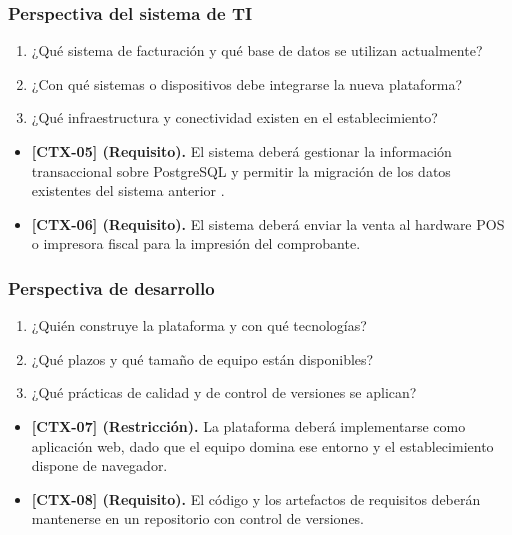 \documentclass[onecolumn,12pt]{IEEEtran}
\begin{document}
\subsubsection{Perspectiva del sistema de TI}
\begin{enumerate}
  \item ¿Qu\'e sistema de facturaci\'on y qu\'e base de datos se utilizan actualmente?
  \item ¿Con qu\'e sistemas o dispositivos debe integrarse la nueva plataforma?
  \item ¿Qu\'e infraestructura y conectividad existen en el establecimiento?
\end{enumerate}
\begin{itemize}
  \item \textbf{[CTX-05] (Requisito).} El sistema deber\'a gestionar la informaci\'on transaccional sobre PostgreSQL y permitir la migraci\'on de los datos existentes del sistema anterior \cite{iso12207}.
  \item \textbf{[CTX-06] (Requisito).} El sistema deber\'a enviar la venta al hardware POS o impresora fiscal para la impresi\'on del comprobante.
\end{itemize}

\subsubsection{Perspectiva de desarrollo}
\begin{enumerate}
  \item ¿Qui\'en construye la plataforma y con qu\'e tecnolog\'ias?
  \item ¿Qu\'e plazos y qu\'e tama\~no de equipo est\'an disponibles?
  \item ¿Qu\'e pr\'acticas de calidad y de control de versiones se aplican?
\end{enumerate}
\begin{itemize}
  \item \textbf{[CTX-07] (Restricci\'on).} La plataforma deber\'a implementarse como aplicaci\'on web, dado que el equipo domina ese entorno y el establecimiento dispone de navegador.
  \item \textbf{[CTX-08] (Requisito).} El c\'odigo y los artefactos de requisitos deber\'an mantenerse en un repositorio con control de versiones.
\end{itemize}
\end{document}
